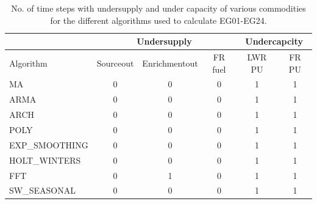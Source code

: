\documentclass[11pt,letterpaper]{article}
\begin{document}
\begin{table}[!h]
	\centering
	\caption {No. of time steps with undersupply and under capacity of various commodities for the different algorithms used to calculate EG01-EG24.}
	\label{tab:24-commod}
	\begin{tabular}{|l|c|c|c|c|c|}
		\hline
		& \multicolumn{3}{c|}{Undersupply} & \multicolumn{2}{c|}{Undercapcity} \\ \hline
		Algorithm & Sourceout & Enrichmentout & FR fuel & LWR PU & FR PU \\ \hline
		MA        & 0 & 0 & 0 & 1 & 1 \\ \hline
		ARMA      & 0 & 0 & 0 & 1 & 1 \\ \hline
		ARCH      & 0 & 0 & 0 & 1 & 1 \\ \hline
		POLY      & 0 & 0 & 0 & 1 & 1 \\ \hline
		EXP\_SMOOTHING & 0 & 0 & 0 & 1 & 1 \\ \hline
		HOLT\_WINTERS  & 0 & 0 & 0 & 1 & 1 \\ \hline
		FFT       & 0 & 1 & 0 & 1 & 1 \\ \hline
		SW\_SEASONAL  & 0 & 0 & 0 & 1 & 1 \\ \hline
	\end{tabular}
\end{table}
\end{document}
